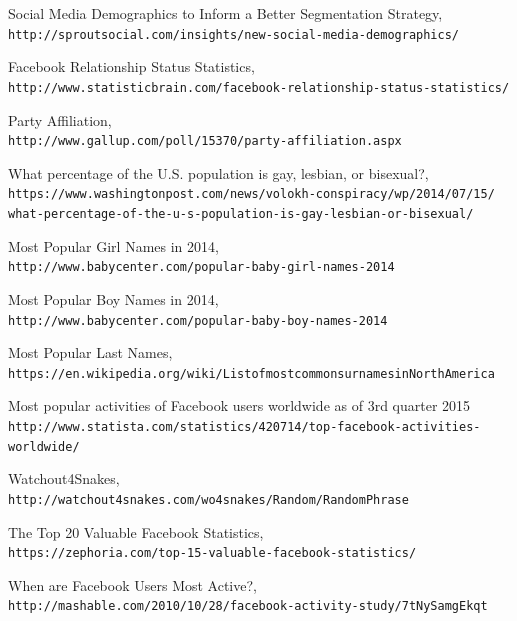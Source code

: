 \documentclass{article}
\begin{document}
\begin{thebibliography}{99}

Social Media Demographics to Inform a Better Segmentation Strategy,
\\\texttt{http://sproutsocial.com/insights/new-social-media-demographics/}

Facebook Relationship Status Statistics,
\\\texttt{http://www.statisticbrain.com/facebook-relationship-status-statistics/}

Party Affiliation,
\\\texttt{http://www.gallup.com/poll/15370/party-affiliation.aspx}

What percentage of the U.S. population is gay, lesbian, or bisexual?,
\\\texttt{https://www.washingtonpost.com/news/volokh-conspiracy/wp/2014/07/15/
what-percentage-of-the-u-s-population-is-gay-lesbian-or-bisexual/}

Most Popular Girl Names in 2014,
\\\texttt{http://www.babycenter.com/popular-baby-girl-names-2014}

Most Popular Boy Names in 2014,
\\\texttt{http://www.babycenter.com/popular-baby-boy-names-2014}

Most Popular Last Names,
\\\texttt{https://en.wikipedia.org/wiki/ListofmostcommonsurnamesinNorthAmerica}

Most popular activities of Facebook users worldwide as of 3rd quarter 2015
\\\texttt{http://www.statista.com/statistics/420714/top-facebook-activities-worldwide/}

Watchout4Snakes,
\\\texttt{http://watchout4snakes.com/wo4snakes/Random/RandomPhrase}

The Top 20 Valuable Facebook Statistics,
\\\texttt{https://zephoria.com/top-15-valuable-facebook-statistics/}

When are Facebook Users Most Active?,
\\\texttt{http://mashable.com/2010/10/28/facebook-activity-study/7tNySamgEkqt}

\end{thebibliography}
\end{document}
